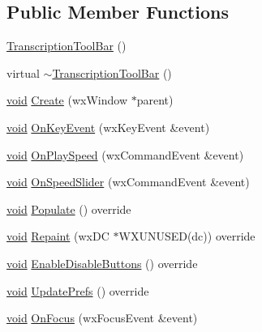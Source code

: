 \subsection*{Public Member Functions}
\begin{DoxyCompactItemize}
\item 
\hyperlink{class_transcription_tool_bar_ac653dde05041b1171f77ceb1cef78160}{Transcription\+Tool\+Bar} ()
\item 
virtual \hyperlink{class_transcription_tool_bar_a8c2dd941b94af87ca46c3acba22f5493}{$\sim$\+Transcription\+Tool\+Bar} ()
\item 
\hyperlink{sound_8c_ae35f5844602719cf66324f4de2a658b3}{void} \hyperlink{class_transcription_tool_bar_a684fad500790f9ab8cc1e40ddee1608f}{Create} (wx\+Window $\ast$parent)
\item 
\hyperlink{sound_8c_ae35f5844602719cf66324f4de2a658b3}{void} \hyperlink{class_transcription_tool_bar_adad09806b2a0099dea98f987b78bb9fc}{On\+Key\+Event} (wx\+Key\+Event \&event)
\item 
\hyperlink{sound_8c_ae35f5844602719cf66324f4de2a658b3}{void} \hyperlink{class_transcription_tool_bar_a87f72fb85d691c5bf1acb7328d5669b9}{On\+Play\+Speed} (wx\+Command\+Event \&event)
\item 
\hyperlink{sound_8c_ae35f5844602719cf66324f4de2a658b3}{void} \hyperlink{class_transcription_tool_bar_afe16b3eb26f4747e58557f6916c1c72b}{On\+Speed\+Slider} (wx\+Command\+Event \&event)
\item 
\hyperlink{sound_8c_ae35f5844602719cf66324f4de2a658b3}{void} \hyperlink{class_transcription_tool_bar_ab996e6011a6d76dc54f3722250f29f16}{Populate} () override
\item 
\hyperlink{sound_8c_ae35f5844602719cf66324f4de2a658b3}{void} \hyperlink{class_transcription_tool_bar_a01f859f974f8de93a87c54de99d17efd}{Repaint} (wx\+DC $\ast$W\+X\+U\+N\+U\+S\+ED(dc)) override
\item 
\hyperlink{sound_8c_ae35f5844602719cf66324f4de2a658b3}{void} \hyperlink{class_transcription_tool_bar_aed3f89d3d8837ab4cb625e797cc38697}{Enable\+Disable\+Buttons} () override
\item 
\hyperlink{sound_8c_ae35f5844602719cf66324f4de2a658b3}{void} \hyperlink{class_transcription_tool_bar_a0050d3e1b08ad9b8a8af2750cb62c7b0}{Update\+Prefs} () override
\item 
\hyperlink{sound_8c_ae35f5844602719cf66324f4de2a658b3}{void} \hyperlink{class_transcription_tool_bar_abfb8156d77dc9238caeeab1c51c016fe}{On\+Focus} (wx\+Focus\+Event \&event)
\item 

\end{DoxyCompactItemize}
